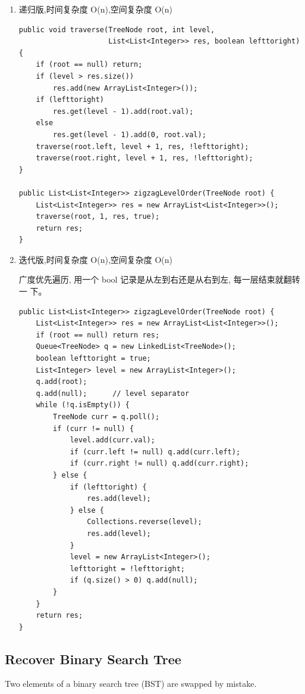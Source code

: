 \documentclass[12pt]{book}
\begin{document}
\begin{enumerate}
\item 递归版,时间复杂度 O(n),空间复杂度 O(n)
\label{sec-4-2-6-1}

\lstset{language=java,label= ,caption= ,numbers=none}
\begin{lstlisting}
public void traverse(TreeNode root, int level,
                     List<List<Integer>> res, boolean lefttoright) {
    if (root == null) return;
    if (level > res.size())
        res.add(new ArrayList<Integer>());
    if (lefttoright)
        res.get(level - 1).add(root.val);
    else
        res.get(level - 1).add(0, root.val);
    traverse(root.left, level + 1, res, !lefttoright);
    traverse(root.right, level + 1, res, !lefttoright);
}

public List<List<Integer>> zigzagLevelOrder(TreeNode root) {
    List<List<Integer>> res = new ArrayList<List<Integer>>();
    traverse(root, 1, res, true);
    return res;
}
\end{lstlisting}

\item 迭代版,时间复杂度 O(n),空间复杂度 O(n)
\label{sec-4-2-6-2}

广度优先遍历, 用一个 bool 记录是从左到右还是从右到左, 每一层结束就翻转一
下。

\lstset{language=java,label= ,caption= ,numbers=none}
\begin{lstlisting}
public List<List<Integer>> zigzagLevelOrder(TreeNode root) {
    List<List<Integer>> res = new ArrayList<List<Integer>>();
    if (root == null) return res;
    Queue<TreeNode> q = new LinkedList<TreeNode>();
    boolean lefttoright = true;
    List<Integer> level = new ArrayList<Integer>();
    q.add(root);
    q.add(null);      // level separator
    while (!q.isEmpty()) {
        TreeNode curr = q.poll();
        if (curr != null) {
            level.add(curr.val);
            if (curr.left != null) q.add(curr.left);
            if (curr.right != null) q.add(curr.right);
        } else {
            if (lefttoright) {
                res.add(level);
            } else {
                Collections.reverse(level);
                res.add(level);
            }
            level = new ArrayList<Integer>();
            lefttoright = !lefttoright;
            if (q.size() > 0) q.add(null);
        }
    }
    return res;
}
\end{lstlisting}
\end{enumerate}

\subsection{Recover Binary Search Tree}
\label{sec-4-2-7}
Two elements of a binary search tree (BST) are swapped by mistake.
\end{document}
